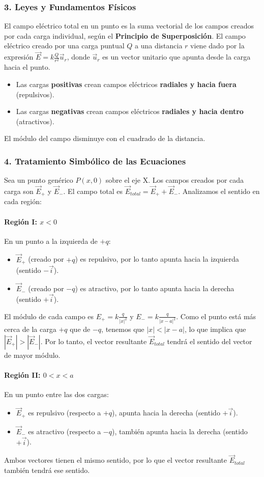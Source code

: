 \subsubsection*{3. Leyes y Fundamentos Físicos}
El campo eléctrico total en un punto es la suma vectorial de los campos creados por cada carga individual, según el \textbf{Principio de Superposición}. El campo eléctrico creado por una carga puntual $Q$ a una distancia $r$ viene dado por la expresión $\vec{E} = k \frac{Q}{r^2} \vec{u}_r$, donde $\vec{u}_r$ es un vector unitario que apunta desde la carga hacia el punto.
\begin{itemize}
    \item Las cargas \textbf{positivas} crean campos eléctricos \textbf{radiales y hacia fuera} (repulsivos).
    \item Las cargas \textbf{negativas} crean campos eléctricos \textbf{radiales y hacia dentro} (atractivos).
\end{itemize}
El módulo del campo disminuye con el cuadrado de la distancia.

\subsubsection*{4. Tratamiento Simbólico de las Ecuaciones}
Sea un punto genérico $P(x,0)$ sobre el eje X. Los campos creados por cada carga son $\vec{E}_+$ y $\vec{E}_-$. El campo total es $\vec{E}_{total} = \vec{E}_+ + \vec{E}_-$. Analizamos el sentido en cada región:

\paragraph*{Región I: $x < 0$}
En un punto a la izquierda de $+q$:
\begin{itemize}
    \item $\vec{E}_+$ (creado por $+q$) es repulsivo, por lo tanto apunta hacia la izquierda (sentido $-\vec{i}$).
    \item $\vec{E}_-$ (creado por $-q$) es atractivo, por lo tanto apunta hacia la derecha (sentido $+\vec{i}$).
\end{itemize}
El módulo de cada campo es $E_+ = k\frac{q}{|x|^2}$ y $E_- = k\frac{q}{|x-a|^2}$. Como el punto está más cerca de la carga $+q$ que de $-q$, tenemos que $|x| < |x-a|$, lo que implica que $|\vec{E}_+| > |\vec{E}_-|$. Por lo tanto, el vector resultante $\vec{E}_{total}$ tendrá el sentido del vector de mayor módulo.

\paragraph*{Región II: $0 < x < a$}
En un punto entre las dos cargas:
\begin{itemize}
    \item $\vec{E}_+$ es repulsivo (respecto a $+q$), apunta hacia la derecha (sentido $+\vec{i}$).
    \item $\vec{E}_-$ es atractivo (respecto a $-q$), también apunta hacia la derecha (sentido $+\vec{i}$).
\end{itemize}
Ambos vectores tienen el mismo sentido, por lo que el vector resultante $\vec{E}_{total}$ también tendrá ese sentido.

